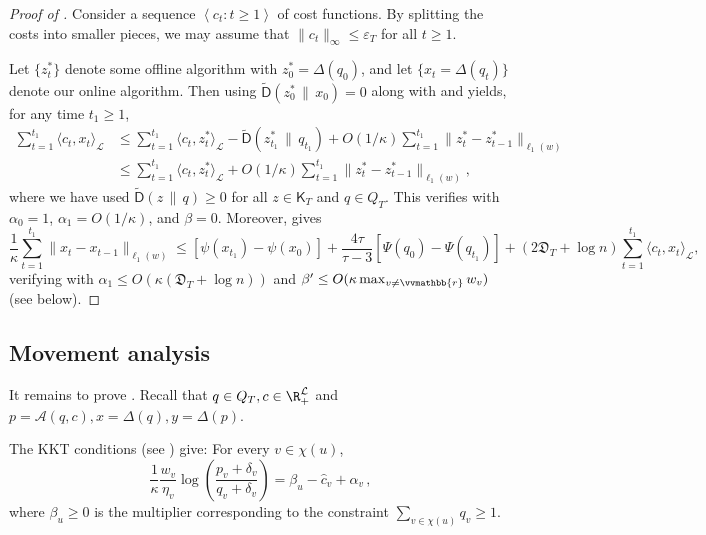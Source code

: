 \documentclass{toc}
\newcommand{\calA}{\mathcal A}
\newcommand{\calL}{\mathcal L}
\newcommand{\dmid}{\,\|\,}
\newcommand{\eps}{\varepsilon}
\newcommand{\depth}{\mathfrak{D}}
\newcommand{\vvr}{\vvmathbb{r}}
\newcommand{\sfD}{\mathsf D}
\newcommand{\sfK}{\mathsf K}
\newcommand{\tilD}{\tilde{\sfD}}
\newcommand{\llangle}{\left\langle}
\newcommand{\rrangle}{\right\rangle}
\begin{document}
\begin{proof}[Proof of ]
	Consider a sequence $\llangle c_t : t \geq 1\rrangle$ of cost functions.
	By splitting the costs into smaller pieces, we may assume that $\|c_t\|_{\infty} \leq \eps_T$ for all $t \geq 1$.
	
	Let $\{z_t^*\}$ denote some offline algorithm with $z_0^* = \Delta(q_0)$, and let $\{x_t = \Delta(q_t)\}$ denote our
	online algorithm.  Then using $\tilD(z_{0}^* \dmid x_0) = 0$ along with  and 
	yields, for any time $t_1 \geq 1$,
	\begin{align*}
	\sum_{t=1}^{t_1} \langle c_t, x_t\rangle_{\calL} &\leq 
	\sum_{t=1}^{t_1} \langle c_t,z_t^*\rangle_{\calL} -
	\tilD(z_{t_1}^* \dmid q_{t_1}) + O(1/\kappa) \sum_{t=1}^{t_1} \|z_t^*-z_{t-1}^*\|_{\ell_1(w)} \\
	&\leq \sum_{t=1}^{t_1} \langle c_t,z_t^*\rangle_{\calL}
	+ O(1/\kappa) \sum_{t=1}^{t_1} \|z_t^*-z_{t-1}^*\|_{\ell_1(w)},
	\end{align*}
	where we have used $\tilD(z \dmid q) \geq 0$ for all $z \in \sfK_T$ and $q \in Q_T$.
	This verifies  with $\alpha_0=1$, $\alpha_1 = O(1/\kappa)$, and $\beta = 0$.
	Moreover,  gives
	\[
	\frac{1}{\kappa} \sum_{t=1}^{t_1} \|x_t-x_{t-1}\|_{\ell_1(w)} \leq 
	\left[\psi(x_{t_1})-\psi(x_0)\right]+\frac{4\tau}{\tau-3} \left[\Psi(q_0)-\Psi(q_{t_1})\right] + \left(2\depth_T + \log n\right) 
	\sum_{t=1}^{t_1} \langle c_t,x_t\rangle_{\calL},
	\]
	verifying  with $\alpha_1 \leq O(\kappa(\depth_T + \log n))$ and $\beta' \leq O(\kappa \max_{v \neq \vvr} w_v)$ (see  below).
\end{proof}

\subsection{Movement analysis}
\label{sec:movement-analysis}

It remains to prove .
Recall that $q \in Q_T, c \in \R_+^{\calL}$ and $p = \calA(q,c), x=\Delta(q),y=\Delta(p)$.

The KKT conditions %
(see ) %
give:  For every $v \in \chi(u)$,
\begin{equation}\label{eq:kkt2}
\frac{1}{\kappa} \frac{w_v}{\eta_v} \log \left(\frac{p_v+\delta_v}{q_v+\delta_v}\right) = \beta_u - \hat{c}_v + \alpha_v\,,
\end{equation}
where $\beta_u \geq 0$ is the multiplier corresponding to the constraint $\sum_{v \in \chi(u)} q_v \geq 1$.
\end{document}
